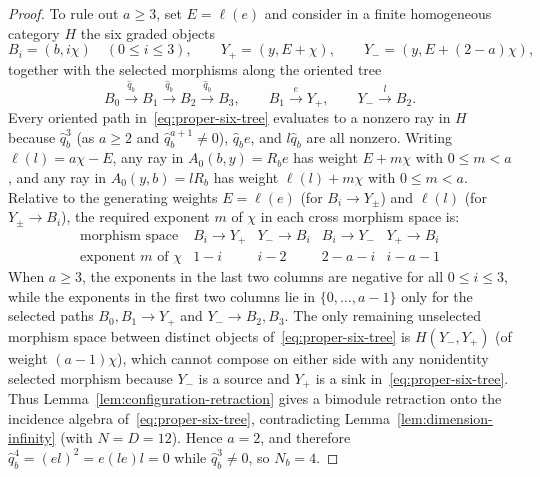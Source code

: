 \begin{proof}
To rule out $a\geq3$, set $E=\ell(e)$ and consider in a finite homogeneous category $H$ the six graded objects
\[
  B_i=(b,i\chi)\quad(0\leq i\leq3),\qquad
  Y_+=(y,E+\chi),\qquad Y_-=(y,E+(2-a)\chi),
\]
together with the selected morphisms along the oriented tree
\begin{equation}
  B_0\xrightarrow{\widehat q_b}B_1\xrightarrow{\widehat q_b}B_2\xrightarrow{\widehat q_b}B_3,\qquad
  B_1\xrightarrow{e}Y_+,\qquad Y_-\xrightarrow{l}B_2.
  \label{eq:proper-six-tree}
\end{equation}
Every oriented path in~\eqref{eq:proper-six-tree} evaluates to a nonzero ray in $H$ because $\widehat q_b^3$ (as $a\geq2$ and $\widehat q_b^{a+1}\ne0$), $\widehat q_be$, and $l\widehat q_b$ are all nonzero. Writing $\ell(l)=a\chi-E$, any ray in $A_0(b,y)=R_be$ has weight $E+m\chi$ with $0\leq m<a$, and any ray in $A_0(y,b)=lR_b$ has weight $\ell(l)+m\chi$ with $0\leq m<a$. Relative to the generating weights $E=\ell(e)$ (for $B_i\to Y_\pm$) and $\ell(l)$ (for $Y_\pm\to B_i$), the required exponent $m$ of $\chi$ in each cross morphism space is:
\[
  \begin{array}{c|cccc}
  \text{morphism space}&B_i\to Y_+&Y_-\to B_i&B_i\to Y_-&Y_+\to B_i\\ \hline
  \text{exponent }m\text{ of }\chi&1-i&i-2&2-a-i&i-a-1
  \end{array}
\]
When $a\geq3$, the exponents in the last two columns are negative for all $0\leq i\leq3$, while the exponents in the first two columns lie in $\{0,\ldots,a-1\}$ only for the selected paths $B_0,B_1\to Y_+$ and $Y_-\to B_2,B_3$. The only remaining unselected morphism space between distinct objects of~\eqref{eq:proper-six-tree} is $H(Y_-,Y_+)$ (of weight $(a-1)\chi$), which cannot compose on either side with any nonidentity selected morphism because $Y_-$ is a source and $Y_+$ is a sink in~\eqref{eq:proper-six-tree}. Thus Lemma~\ref{lem:configuration-retraction} gives a bimodule retraction onto the incidence algebra of~\eqref{eq:proper-six-tree}, contradicting Lemma~\ref{lem:dimension-infinity} (with $N=D=12$). Hence $a=2$, and therefore $\widehat q_b^4=(el)^2=e(le)l=0$ while $\widehat q_b^3\ne0$, so $N_b=4$.
\end{proof}

